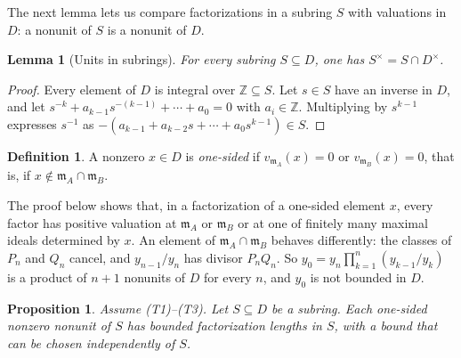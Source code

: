 \documentclass[11pt]{article}
\theoremstyle{plain}
\newtheorem{proposition}[theorem]{Proposition}
\newtheorem{lemma}[theorem]{Lemma}
\theoremstyle{definition}
\newtheorem{definition}[theorem]{Definition}
\theoremstyle{remark}
\newcommand{\Z}{\mathbb Z}
\newcommand{\EA}{\mathfrak m_A}
\newcommand{\EB}{\mathfrak m_B}
\begin{document}
The next lemma lets us compare factorizations in a subring $S$ with
valuations in $D$: a nonunit of $S$ is a nonunit of $D$.

\begin{lemma}[Units in subrings]\label{lem:units}
For every subring $S\subseteq D$, one has
$S^\times=S\cap D^\times$.
\end{lemma}

\begin{proof}
Every element of $D$ is integral over $\Z\subseteq S$.  Let $s\in S$ have
an inverse in $D$, and let $s^{-k}+a_{k-1}s^{-(k-1)}+\cdots+a_0=0$ with
$a_i\in\Z$.  Multiplying by $s^{k-1}$ expresses $s^{-1}$ as
$-(a_{k-1}+a_{k-2}s+\cdots+a_0s^{k-1})\in S$.
\end{proof}

\begin{definition}\label{def:onesided}
A nonzero $x\in D$ is \emph{one-sided} if $v_{\EA}(x)=0$ or
$v_{\EB}(x)=0$, that is, if $x\notin\EA\cap\EB$.
\end{definition}

The proof below shows that, in a factorization of a one-sided element
$x$, every factor has positive valuation at $\EA$ or $\EB$ or at one of
finitely many maximal ideals determined by $x$.  An element of
$\EA\cap\EB$ behaves differently: the classes of $P_n$ and $Q_n$ cancel,
and $y_{n-1}/y_n$ has divisor $P_nQ_n$.  So
$y_0=y_n\prod_{k=1}^n(y_{k-1}/y_k)$ is a product of $n+1$ nonunits of $D$
for every $n$, and $y_0$ is not bounded in $D$.

\begin{proposition}\label{prop:onesided}
Assume \textup{(T1)--(T3)}.  Let $S\subseteq D$ be a subring.  Each
one-sided nonzero nonunit of $S$ has bounded factorization lengths in
$S$, with a bound that can be chosen independently of $S$.
\end{proposition}
\end{document}
